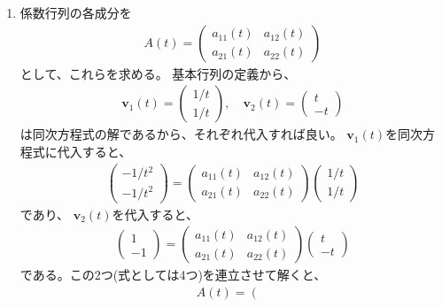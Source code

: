 \documentclass{jsarticle}
\begin{document}
\begin{enumerate}
\item 係数行列の各成分を
\begin{align}
A(t)=\left(
\begin{array}{cc}
a_{11}(t) & a_{12}(t)\\
a_{21}(t) & a_{22}(t)
\end{array}\right)
\end{align}
として、これらを求める。
基本行列の定義から、
\begin{align}
\boldsymbol{v}_{1}(t)=\left(
\begin{array}{c}
1/t\\
1/t
\end{array}
\right),\quad
\boldsymbol{v}_{2}(t)=\left(
\begin{array}{c}
t\\
-t
\end{array}
\right)
\end{align}
は同次方程式の解であるから、それぞれ代入すれば良い。
$\boldsymbol{v}_{1}(t)$を同次方程式に代入すると、
\begin{align}
\left(
\begin{array}{c}
-1/t^{2}\\
-1/t^{2}
\end{array}\right)=
\left(
\begin{array}{cc}
a_{11}(t) & a_{12}(t)\\
a_{21}(t) & a_{22}(t)
\end{array}\right)
\left(
\begin{array}{c}
1/t\\
1/t
\end{array}\right)
\end{align}
であり、
$\boldsymbol{v}_{2}(t)$を代入すると、
\begin{align}
\left(
\begin{array}{c}
1\\
-1
\end{array}\right)=
\left(
\begin{array}{cc}
a_{11}(t) & a_{12}(t)\\
a_{21}(t) & a_{22}(t)
\end{array}\right)
\left(
\begin{array}{c}
t\\
-t
\end{array}\right)
\end{align}
である。この2つ(式としては4つ)を連立させて解くと、
\begin{align}
A(t)=\left(
\begin{array}{cc}

\end{array}
\end{align}
\end{enumerate}
\end{document}
